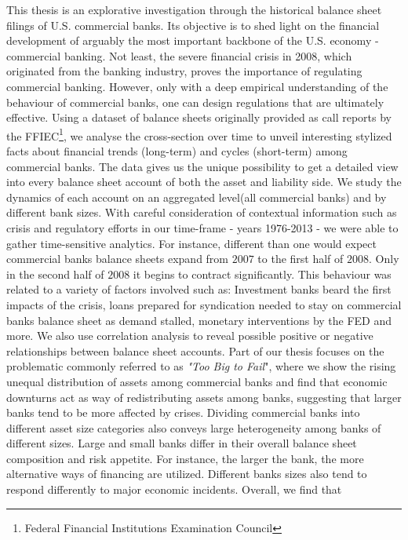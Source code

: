 \documentclass[12pt, a4paper]{article} %
\begin{document}
This thesis is an explorative investigation through the historical balance sheet filings of U.S. commercial banks. Its objective is to shed light on the financial development of arguably the most important backbone of the U.S. economy - commercial banking. Not least, the severe financial crisis in 2008, which originated from the banking industry, proves the importance of regulating commercial banking. However, only with a deep empirical understanding of the behaviour of commercial banks, one can design regulations that are ultimately effective. Using a dataset of balance sheets originally provided as call reports by the FFIEC\footnote{Federal Financial Institutions Examination Council}, we analyse the cross-section over time to unveil interesting stylized facts about financial trends (long-term) and cycles (short-term) among commercial banks. The data gives us the unique possibility to get a detailed view into every balance sheet account of both the asset and liability side. We study the dynamics of each account on an aggregated level(all commercial banks) and by different bank sizes. With careful consideration of contextual information such as crisis and regulatory efforts in our time-frame - years 1976-2013 - we were able to gather time-sensitive analytics. 
For instance, different than one would expect commercial banks balance sheets expand from $2007$ to the first half of $2008$. Only in the second half of $2008$ it begins to contract significantly. This behaviour was related to a variety of factors involved such as: Investment banks beard the first impacts of the crisis, loans prepared for syndication needed to stay on commercial banks balance sheet as demand stalled, monetary interventions by the FED and more.   
We also use correlation analysis to reveal possible positive or negative relationships between balance sheet accounts. Part of our thesis focuses on the problematic commonly referred to as \textit{"Too Big to Fail}", where we show the rising unequal distribution of assets among commercial banks and find that economic downturns act as way of redistributing assets among banks, suggesting that larger banks tend to be more affected by crises. 
Dividing commercial banks into different asset size categories also conveys large heterogeneity among banks of different sizes. 
Large and small banks differ in their overall balance sheet composition and risk appetite. For instance, the larger the bank, the more alternative ways of financing are utilized. Different banks sizes also tend to respond differently to major economic incidents. Overall, we find that
\end{document}
